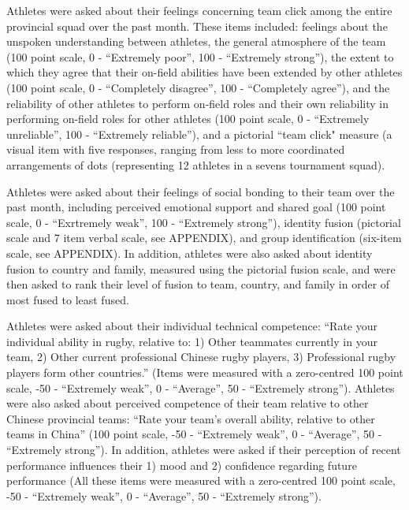 Athletes were asked about their feelings concerning team click among the entire provincial squad over the past month.  These items included: feelings about the unspoken understanding between athletes, the general atmosphere of the team (100 point scale, 0 - ``Extremely poor'', 100 - ``Extremely strong''), the extent to which they agree that their on-field abilities have been extended by other athletes (100 point scale, 0 - ``Completely disagree'', 100 - ``Completely agree''), and the reliability of other athletes to perform on-field roles and their own reliability in performing on-field roles for other athletes (100 point scale, 0 - ``Extremely unreliable'', 100 - ``Extremely reliable''), and a pictorial ``team click" measure (a visual item with five responses, ranging from less to more coordinated arrangements of dots (representing 12 athletes in a sevens tournament squad).

Athletes were asked about their feelings of social bonding to their team over the past month, including perceived emotional support and shared goal (100 point scale, 0 - ``Exrtremely weak'', 100 - ``Extremely strong''), identity fusion (pictorial scale and 7 item verbal scale, see APPENDIX), and group identification (six-item scale, see APPENDIX). In addition, athletes were also asked about identity fusion to country and family, measured using the pictorial fusion scale, and were then asked to rank their level of fusion to team, country, and family in order of most fused to least fused.


Athletes were asked about their individual technical competence: ``Rate your individual ability in rugby, relative to: 1) Other teammates currently in your team, 2) Other current professional Chinese rugby players, 3) Professional rugby players form other countries.'' (Items were measured with a zero-centred 100 point scale, -50 - ``Extremely weak'', 0 - ``Average'', 50 - ``Extremely strong'').  Athletes were also asked about perceived competence of their team relative to other Chinese provincial teams: ``Rate your team's overall ability, relative to other teams in China'' (100 point scale, -50 - ``Extremely weak'', 0 - ``Average'', 50 - ``Extremely strong'').  In addition, athletes were asked if their perception of recent performance influences their 1) mood and 2) confidence regarding future performance (All these items were measured with a zero-centred 100 point scale, -50 - ``Extremely weak'', 0 - ``Average'', 50 - ``Extremely strong'').

